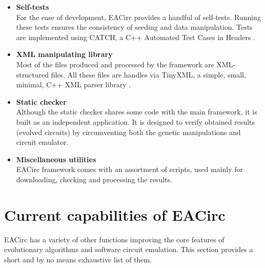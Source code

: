 \documentclass[12pt,oneside]{fithesis2}
\begin{document}
\begin{itemize}
\item \textbf{Self-tests}\\
For the ease of development, EACirc provides a handful of self-tests. Running these tests ensures the consistency
of seeding and data manipulation. Tests are implemented using CATCH, a C++ Automated Test Cases in Headers \parencite{catch}.
\item \textbf{XML manipulating library}\\
Most of the files produced and processed by the framework are XML-structured files. All these files are handles via
TinyXML, a simple, small, minimal, C++ XML parser library \parencite{tinyxml}.
\item \textbf{Static checker}\\
Although the static checker shares some code with the main framework, it is built as an independent application.
It is designed to verify obtained results (evolved circuits) by circumventing both the genetic manipulations and circuit emulator.
\item \textbf{Miscellaneous utilities}\\
EACirc framework comes with an assortment of scripts, used mainly for downloading, checking and processing the results.
\end{itemize}

\section{Current capabilities of EACirc}
\label{sec:eacirc-capabilities}

EACirc has a variety of other functions improving the core features of evolutionary algorithms and software circuit emulation.
This section provides a short and by no means exhaustive list of them.
\end{document}
